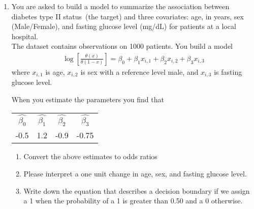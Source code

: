 \begin{enumerate}
    \item You are asked to build a model to summarize the association between diabetes type II status~(the target) and three covariates: age, in years, sex (Male/Female), and fasting glucose level (mg/dL) for patients at a local hospital.\\
    
    The dataset contains observations on 1000 patients. 
    You build a model 
    \begin{align}
        \log \left[\frac{\theta(x)}{\theta(1-x)}\right] = \beta_{0} + \beta_{1} x_{i,1} + \beta_{2}x_{i,2} + \beta_{3}x_{i,3}
    \end{align}
    where $x_{i,1}$ is age, $x_{i,2}$ is sex with a reference level male, and $x_{i,3}$ is fasting glucose level.
    
    When you estimate the parameters you find that
    \begin{table}[ht!]
        \centering
        \begin{tabular}{cccc}
            $\hat{\beta_{0}}$ & $\hat{\beta_{1}}$ & $\hat{\beta_{2}}$ & $\hat{\beta_{3}}$ \\
             -0.5 & 1.2 & -0.9 & -0.75 \\
        \end{tabular}
    \end{table}
    
    \begin{enumerate}
        \item Convert the above estimates to odds ratios
        \item Please interpret a one unit change in age, sex, and fasting glucose level.
        \item Write down the equation that describes a decision boundary if we assign a 1 when the probability of a 1 is greater than 0.50 and a 0 otherwise. 
    \end{enumerate}
    
    
\end{enumerate}










